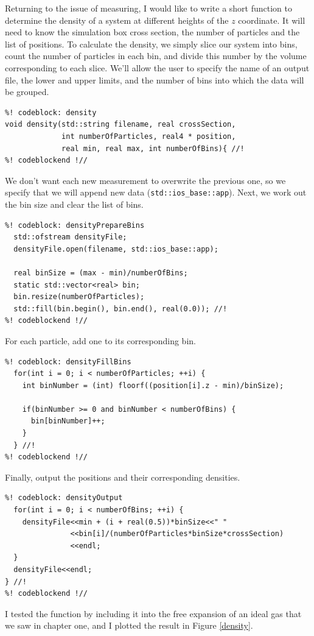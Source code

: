 Returning to the issue of measuring, I would like to write a short function to 
determine the density of a system at different heights of the $z$ coordinate. It 
will need to know the simulation box cross section, the number of particles and 
the list of positions. To calculate the density, we simply slice our system 
into bins, count the number of particles in each bin, and divide this number by 
the volume corresponding to each slice. We'll allow the user to specify the name 
of an output file, the lower and upper limits, and the number of bins into which 
the data will be grouped.
\begin{lstlisting}
%! codeblock: density
void density(std::string filename, real crossSection,
             int numberOfParticles, real4 * position,
             real min, real max, int numberOfBins){ //!
%! codeblockend !//
\end{lstlisting} 
We don't want each new measurement to overwrite the previous one, so we specify 
that we will append new data (\texttt{std::ios\_base::app}). Next, we work out 
the bin size and clear the list of bins.
\begin{lstlisting}
%! codeblock: densityPrepareBins
  std::ofstream densityFile;
  densityFile.open(filename, std::ios_base::app);

  real binSize = (max - min)/numberOfBins;
  static std::vector<real> bin;
  bin.resize(numberOfParticles);
  std::fill(bin.begin(), bin.end(), real(0.0)); //!
%! codeblockend !//
\end{lstlisting}
For each particle, add one to its corresponding bin.
\begin{lstlisting}
%! codeblock: densityFillBins
  for(int i = 0; i < numberOfParticles; ++i) {
    int binNumber = (int) floorf((position[i].z - min)/binSize);

    if(binNumber >= 0 and binNumber < numberOfBins) {
      bin[binNumber]++;
    }
  } //!
%! codeblockend !//
\end{lstlisting}
Finally, output the positions and their corresponding densities.
\begin{lstlisting}
%! codeblock: densityOutput
  for(int i = 0; i < numberOfBins; ++i) {
    densityFile<<min + (i + real(0.5))*binSize<<" "
               <<bin[i]/(numberOfParticles*binSize*crossSection)
               <<endl;
  }
  densityFile<<endl;
} //!
%! codeblockend !//
\end{lstlisting}
I tested the function by including it into the free expansion of an ideal gas 
that we saw in chapter one, and I plotted the result in Figure \ref{density}.


